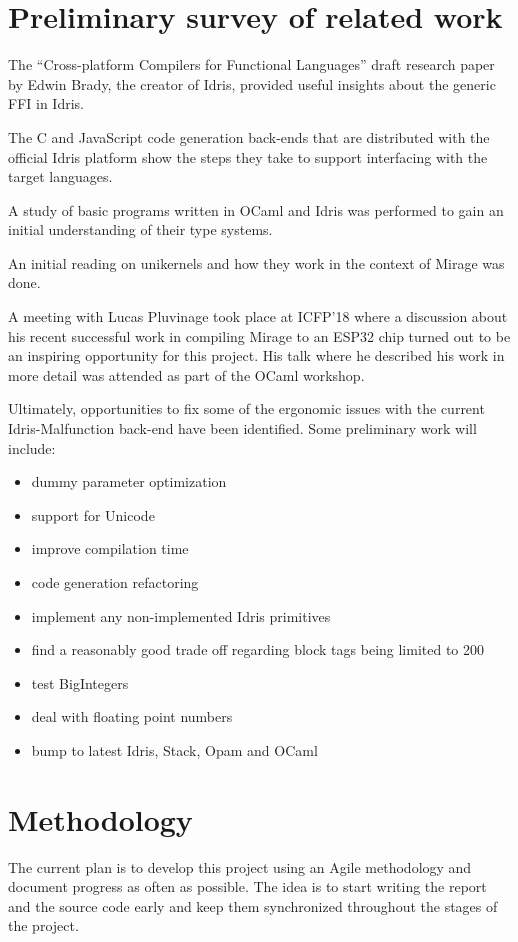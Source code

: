 \documentclass[a4paper, 12pt, oneside]{report}
\begin{document}
\section{Preliminary survey of related work}
The ``Cross-platform Compilers for Functional Languages'' draft
research paper by Edwin Brady, the creator of Idris,
provided useful insights about the generic FFI in Idris.

The C and JavaScript code generation back-ends that are distributed
with the official Idris platform show the steps they take to
support interfacing with the target languages.

A study of basic programs written in OCaml and Idris was performed to gain an
initial understanding of their type systems.

An initial reading on unikernels and how they
work in the context of Mirage was done.

A meeting with Lucas Pluvinage took place at ICFP'18 where a discussion
about his recent successful work in compiling Mirage to an ESP32 chip turned
out to be an inspiring opportunity for this project.
His talk where he described his work in more detail was attended as part of the
OCaml workshop.

Ultimately, opportunities to fix some of the ergonomic issues
with the current Idris-Malfunction back-end have been
identified.
Some preliminary work will include:
\begin{itemize}
	\item dummy parameter optimization
	\item support for Unicode
	\item improve compilation time
	\item code generation refactoring
	\item implement any non-implemented Idris primitives
	\item find a reasonably good trade off regarding block
	      tags being limited to 200
	\item test BigIntegers
	\item deal with floating point numbers
	\item bump to latest Idris, Stack, Opam and OCaml
\end{itemize}


\section{Methodology}
The current plan is to develop this project using an Agile
methodology and document progress as often as possible.
The idea is to start writing the report and the source code early and keep
them synchronized throughout the stages of the project.
\end{document}
